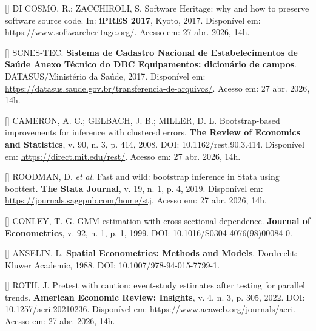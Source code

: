 \documentclass[12pt,a4paper,oneside]{article}
\begin{document}
\begin{singlespace}
\noindent\hangindent=1.25cm
[\thebibctr] DI COSMO, R.; ZACCHIROLI, S. Software Heritage: why and how to
preserve software source code. In: \textbf{iPRES 2017}, Kyoto,
2017. Disponível em: \url{https://www.softwareheritage.org/}.
Acesso em: 27 abr. 2026, 14h.\label{ref:swh}\par\smallskip

\noindent\hangindent=1.25cm
[\thebibctr] SCNES-TEC. \textbf{Sistema de Cadastro Nacional de Estabelecimentos
de Saúde \textendash{} Anexo Técnico do DBC Equipamentos: dicionário
de campos}. DATASUS/Ministério da Saúde, 2017. Disponível em:
\url{https://datasus.saude.gov.br/transferencia-de-arquivos/}.
Acesso em: 27 abr. 2026, 14h.\label{ref:scnes-tec}\par\smallskip

\noindent\hangindent=1.25cm
[\thebibctr] CAMERON, A. C.; GELBACH, J. B.; MILLER, D. L. Bootstrap-based
improvements for inference with clustered errors. \textbf{The
Review of Economics and Statistics}, v. 90, n. 3, p. 414,
2008. DOI: 10.1162/rest.90.3.414. Disponível em:
\url{https://direct.mit.edu/rest/}. Acesso em: 27 abr. 2026,
14h.\label{ref:cameron}\par\smallskip

\noindent\hangindent=1.25cm
[\thebibctr] ROODMAN, D. \textit{et al.} Fast and wild: bootstrap inference in
Stata using boottest. \textbf{The Stata Journal}, v. 19, n. 1,
p. 4, 2019. Disponível em:
\url{https://journals.sagepub.com/home/stj}. Acesso em: 27 abr.
2026, 14h.\label{ref:roodman}\par\smallskip

\noindent\hangindent=1.25cm
[\thebibctr] CONLEY, T. G. GMM estimation with cross sectional dependence.
\textbf{Journal of Econometrics}, v. 92, n. 1, p. 1,
1999. DOI: 10.1016/S0304-4076(98)00084-0.\label{ref:conley}\par\smallskip

\noindent\hangindent=1.25cm
[\thebibctr] ANSELIN, L. \textbf{Spatial Econometrics: Methods and Models}.
Dordrecht: Kluwer Academic, 1988. DOI:
10.1007/978-94-015-7799-1.\label{ref:anselin}\par\smallskip

\noindent\hangindent=1.25cm
[\thebibctr] ROTH, J. Pretest with caution: event-study estimates after testing
for parallel trends. \textbf{American Economic Review: Insights},
v. 4, n. 3, p. 305, 2022. DOI:
10.1257/aeri.20210236. Disponível em:
\url{https://www.aeaweb.org/journals/aeri}. Acesso em: 27 abr.
2026, 14h.\label{ref:roth}\par\smallskip


\end{singlespace}
\end{document}
